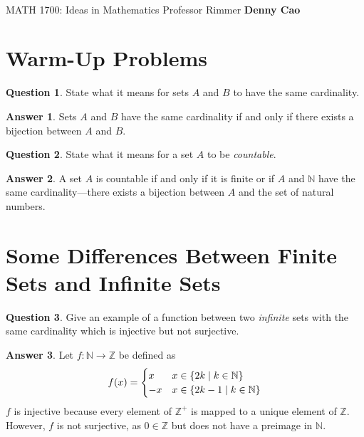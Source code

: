 \documentclass[article, 12pt]{article}
\title{\LARGE\bf{\psetName}}
\author{\name}
\date{\dueDate}
\author{\name}
\date{\dueDate}
\makeatletter
\theoremstyle{definition}
\newcommand{\courseNumber}{MATH 1700}
\newcommand{\courseName}{Ideas in Mathematics}
\newcommand{\professor}{Professor Rimmer}
\newcommand{\name}{Denny Cao}
\newtheorem{question}{Question}
\newtheorem{answer}{Answer}
\DeclarePairedDelimiter\set{\{}{\}}
\newcommand{\ints}{\mathbb{Z}}
\newcommand{\nats}{\mathbb{N}}
\renewcommand{\maketitle}{\bgroup\setlength{\parindent}{0pt}
    \begin{flushleft}
        \textbf{\@title} \\ \vskip0.2cm
        \begingroup
            \fontsize{14pt}{12pt}\selectfont
            \courseNumber: \courseName 
            \vskip0.3cm 
            \professor
        \endgroup \vskip0.3cm
        \@date \hfill\rlap{}\bf{\name} \\ \vskip0.1cm
        \hrulefill
    \end{flushleft}\egroup 
}
\makeatother
\begin{document}
    \maketitle
    \thispagestyle{empty}

    \section{Warm-Up Problems}
    \begin{question}
        State what it means for sets $A$ and $B$ to have the same cardinality.
    \end{question}

    \begin{answer}
        Sets $A$ and $B$ have the same cardinality if and only if there exists a bijection between $A$ and $B$.
    \end{answer}

    \begin{question}
        State what it means for a set $A$ to be \textit{countable}.
    \end{question}

    \begin{answer}
        A set $A$ is countable if and only if it is finite or if $A$ and $\nats$ have the same cardinality---there exists a bijection between $A$ and the set of natural numbers.
    \end{answer}

    \section{Some Differences Between Finite Sets and Infinite Sets}
    \begin{question}
        Give an example of a function between two \textit{infinite} sets with the same cardinality which is injective but not surjective.
    \end{question}

    \begin{answer}
        Let $f: \nats \to \ints$ be defined as 
        \[ f(x) = \begin{cases} 
            x & x \in \set*{2k \mid k \in \nats} \\
            -x & x \in \set*{2k - 1 \mid k \in \nats}
        \end{cases} \]
        $f$ is injective because every element of $\ints^+$ is mapped to a unique element of $\ints$. However, $f$ is not surjective, as $0 \in \ints$ but does not have a preimage in $\nats$.
    \end{answer}
\end{document}
